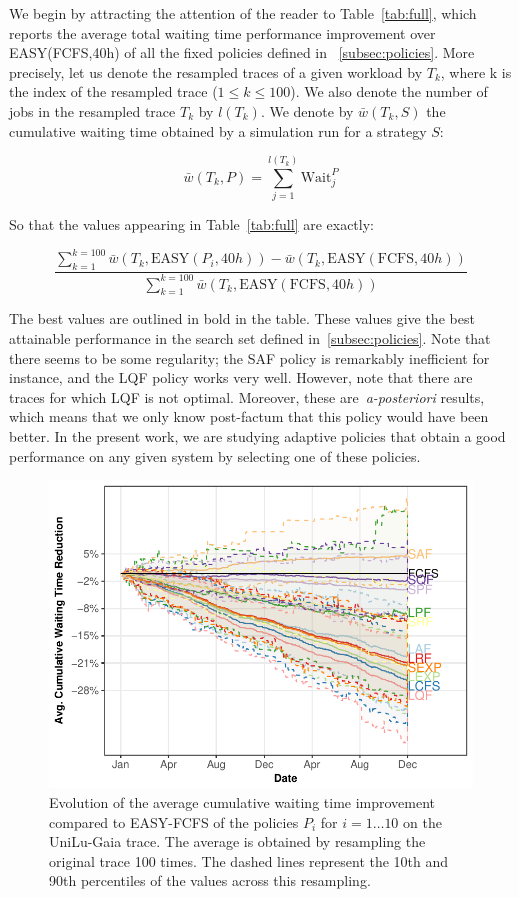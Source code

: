 \documentclass[sigconf,anonymous]{acmart}
\begin{document}
We begin by attracting the attention of the reader to Table~\ref{tab:full},
which reports the average total waiting time performance improvement over
EASY(FCFS,40h) of all the fixed policies defined in ~\ref{subsec:policies}. More
precisely, let us denote the resampled traces of a given workload by $T_k$,
where k is the index of the resampled trace ($1 \le k \le 100$). We also denote
the number of jobs in the resampled trace $T_k$ by $l(T_k)$. We denote by
$\bar{w}(T_k,S)$ the cumulative waiting time obtained by a simulation run for a
strategy $S$:

\begin{equation}
  \bar{w}(T_k,P) = \sum_{j=1}^{l(T_k)} \text{Wait}_j^{P}
\end{equation}

So that the values appearing in Table~\ref{tab:full} are exactly:

\begin{equation}
  \frac{\sum_{k=1}^{k=100}\bar{w}(T_k,\text{EASY}(P_i,40h))-
  \bar{w}(T_k,\text{EASY}(\text{FCFS},40h))}{\sum_{k=1}^{k=100}\bar{w}(T_k,\text{EASY}(\text{FCFS},40h))}
\end{equation}

The best values are outlined in bold in the table. These values give the best
attainable performance in the search set defined in~\ref{subsec:policies}.
Note that there seems to be some regularity; the SAF policy is remarkably
inefficient for instance, and the LQF policy works very well. However, note
that there are traces for which LQF is not optimal. Moreover, these
are~\textit{a-posteriori} results, which means that we only know post-factum
that this policy would have been better. In the present work, we are
studying adaptive policies that obtain a good performance on any given system
by selecting one of these policies.

\begin{figure}[]
  \centering
  \includegraphics[scale=0.6]{figures/full-ANL-Intr.pdf}
  \caption{Evolution of the average cumulative waiting time improvement
    compared to EASY-FCFS of the policies $P_i$ for $i = 1 \ldots 10$ on the
    UniLu-Gaia trace. The average is obtained by resampling the original trace
    100 times. The dashed lines represent the 10th and 90th percentiles of the
  values across this resampling.}
  \label{fig:all}
\end{figure}
\end{document}
